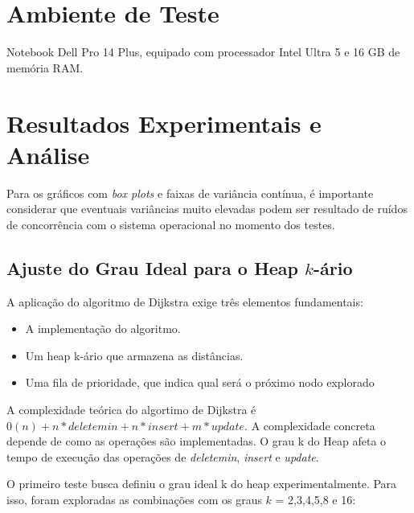 \documentclass{infufrgs}
\begin{document}
\section{Ambiente de Teste}
Notebook Dell Pro 14 Plus, equipado com processador Intel Ultra 5 e 16 GB de memória RAM.



\section{Resultados Experimentais e Análise}

Para os gráficos com \textit{box plots} e faixas de variância contínua, 
é importante considerar que eventuais variâncias muito elevadas podem 
ser resultado de ruídos de 
concorrência com o sistema operacional no momento dos testes.


\subsection{Ajuste do Grau Ideal para o Heap $k$-ário}

A aplicação do algoritmo de Dijkstra exige três elementos fundamentais:

\begin{itemize}
    \item A implementação do algoritmo. 
    \item Um heap k-ário que armazena as distâncias.
    \item Uma fila de prioridade, que indica qual será o próximo nodo explorado
\end{itemize}

A complexidade teórica do algortimo de Dijkstra é $ 0(n) + n * deletemin + n * insert + m * update$. A complexidade 
concreta depende de como as operações são implementadas. O grau k do Heap afeta o tempo de execução das operações de
 \textit{deletemin}, \textit{insert} e \textit{update}.

 O primeiro teste busca definiu o grau ideal k do heap experimentalmente. Para isso, 
foram exploradas as combinações com os graus $k$ = 2,3,4,5,8 e 16: 
\end{document}
